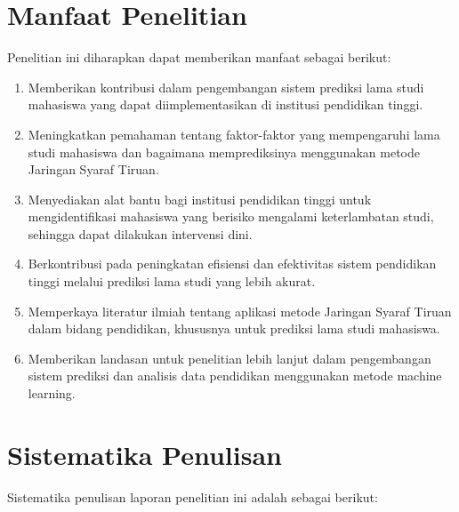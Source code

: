 \section{Manfaat Penelitian}
Penelitian ini diharapkan dapat memberikan manfaat sebagai berikut:

    \begin{enumerate}
        \item Memberikan kontribusi dalam pengembangan sistem prediksi lama studi mahasiswa yang dapat diimplementasikan di institusi pendidikan tinggi.
        \item Meningkatkan pemahaman tentang faktor-faktor yang mempengaruhi lama studi mahasiswa dan bagaimana memprediksinya menggunakan metode Jaringan Syaraf Tiruan.
        \item Menyediakan alat bantu bagi institusi pendidikan tinggi untuk mengidentifikasi mahasiswa yang berisiko mengalami keterlambatan studi, sehingga dapat dilakukan intervensi dini.
        \item Berkontribusi pada peningkatan efisiensi dan efektivitas sistem pendidikan tinggi melalui prediksi lama studi yang lebih akurat.
        \item Memperkaya literatur ilmiah tentang aplikasi metode Jaringan Syaraf Tiruan dalam bidang pendidikan, khususnya untuk prediksi lama studi mahasiswa.
        \item Memberikan landasan untuk penelitian lebih lanjut dalam pengembangan sistem prediksi dan analisis data pendidikan menggunakan metode machine learning.
    \end{enumerate}

\section{Sistematika Penulisan}
Sistematika penulisan laporan penelitian ini adalah sebagai berikut:

